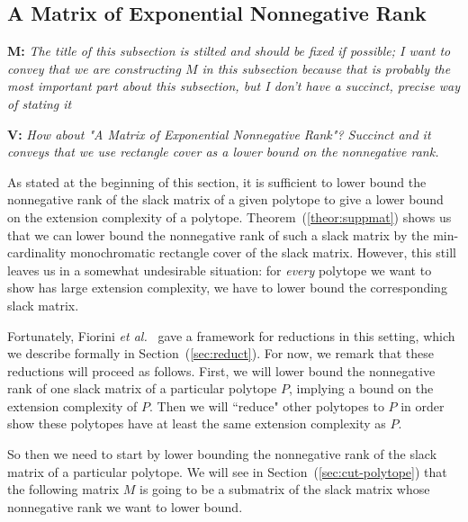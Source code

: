 \documentclass{article}
\makeatletter
\theoremstyle{definition}
\theoremstyle{remark}
\newcommand{\cetal}{\textit{et al.\@}}  %
\newcommand{\rank}{\operatorname{rank}}
\newcommand{\vnote}[1]{{\color{magenta}\noindent\textbf{V: }\marginpar{****}\textit{{#1}}}}
\newcommand{\mnote}[1]{{\color{blue}\noindent\textbf{M: }\marginpar{****}\textit{{#1}}}}
\makeatother
\begin{document}

\subsection{A Matrix of Exponential Nonnegative Rank}\label{sec:rec-cover}

\mnote{The title of this subsection is stilted and should be fixed if possible; I want to convey that we are constructing $M$ in this subsection because that is probably the most important part about this subsection, but I don't have a succinct, precise way of stating it}

\vnote{How about "A Matrix of Exponential Nonnegative Rank"? Succinct and it conveys that we use rectangle cover as a lower bound on the nonnegative rank.}

As stated at the beginning of this section, it is sufficient to lower bound the nonnegative rank of the slack matrix of a given polytope to give a lower bound on the extension complexity of a polytope. Theorem~(\ref{theor:suppmat}) shows us that we can lower bound the nonnegative rank of such a slack matrix by the min-cardinality monochromatic rectangle cover of the slack matrix. However, this still leaves us in a somewhat undesirable situation: for \emph{every} polytope we want to show has large extension complexity, we have to lower bound the corresponding slack matrix.

Fortunately, Fiorini \cetal~\cite{fiorini} gave a framework for reductions in this setting, which we describe formally in Section~(\ref{sec:reduct}). For now, we remark that these reductions will proceed as follows. First, we will lower bound the nonnegative rank of one slack matrix of a particular polytope $P$, implying a bound on the extension complexity of $P$. Then we will ``reduce" other polytopes to $P$ in order show these polytopes have at least the same extension complexity as $P$. 

So then we need to start by lower bounding the nonnegative rank of the slack matrix of a particular polytope. We will see in Section~(\ref{sec:cut-polytope}) that the following matrix $M$ is going to be a submatrix of the slack matrix whose nonnegative rank we want to lower bound.
\end{document}

